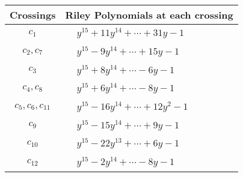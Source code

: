 \documentclass[1p]{elsarticle_modified}
\theoremstyle{definition}
\begin{document}
\begin{tabular}{m{50pt}|m{274pt}}
Crossings & \hspace{64pt}Riley Polynomials at each crossing \\
\hline $$\begin{aligned}c_{1}\end{aligned}$$&$\begin{aligned}
&y^{15}+11 y^{14}+\cdots+31 y-1
\end{aligned}$\\
\hline $$\begin{aligned}c_{2},c_{7}\end{aligned}$$&$\begin{aligned}
&y^{15}-9 y^{14}+\cdots+15 y-1
\end{aligned}$\\
\hline $$\begin{aligned}c_{3}\end{aligned}$$&$\begin{aligned}
&y^{15}+8 y^{14}+\cdots-6 y-1
\end{aligned}$\\
\hline $$\begin{aligned}c_{4},c_{8}\end{aligned}$$&$\begin{aligned}
&y^{15}+6 y^{14}+\cdots-8 y-1
\end{aligned}$\\
\hline $$\begin{aligned}c_{5},c_{6},c_{11}\end{aligned}$$&$\begin{aligned}
&y^{15}-16 y^{14}+\cdots+12 y^2-1
\end{aligned}$\\
\hline $$\begin{aligned}c_{9}\end{aligned}$$&$\begin{aligned}
&y^{15}-15 y^{14}+\cdots+9 y-1
\end{aligned}$\\
\hline $$\begin{aligned}c_{10}\end{aligned}$$&$\begin{aligned}
&y^{15}-22 y^{13}+\cdots+6 y-1
\end{aligned}$\\
\hline $$\begin{aligned}c_{12}\end{aligned}$$&$\begin{aligned}
&y^{15}-2 y^{14}+\cdots-8 y-1
\end{aligned}$\\
\hline
\end{tabular}\\~\\
\end{document}
